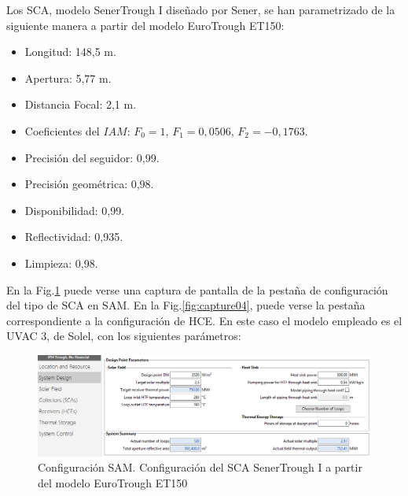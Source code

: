 Los SCA, modelo SenerTrough I diseñado por Sener, se han parametrizado de la siguiente manera a partir del modelo EuroTrough ET150:

\begin{itemize}[itemsep=2pt,parsep=2pt]
\item
  Longitud: 148,5 m.
\item
  Apertura: 5,77 m.
\item
  Distancia Focal: 2,1 m.
\item
  Coeficientes del \(IAM\): \(F_{0}=1\), \(F_{1}=0,0506\),
  \(F_{2}=-0,1763\).
\item
  Precisión del seguidor: 0,99.
\item
  Precisión geométrica: 0,98.
\item
  Disponibilidad: 0,99.
\item
  Reflectividad: 0,935.
\item
  Limpieza: 0,98.
\end{itemize}


En la Fig.\ref{fig:captura03} puede verse una captura de pantalla de la pestaña de configuración del tipo de SCA en SAM. En la Fig.\ref{fig:capture04}, puede verse la pestaña correspondiente a la configuración de HCE. En este caso el modelo empleado es el UVAC 3, de Solel, con los siguientes parámetros:


\begin{figure}
\includegraphics[width=0.9\linewidth]{images/captura_sam_iph02.png}
\caption{Configuración SAM. Configuración del SCA SenerTrough I a partir del modelo EuroTrough ET150} 
\label{fig:captura03}
\end{figure}

